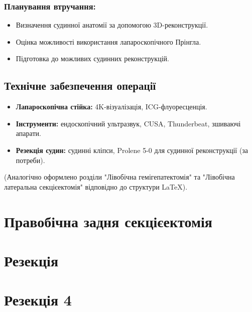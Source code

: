 \begin{refsection}
\subsubsection{Планування втручання:}
\begin{itemize}
    \item Визначення судинної анатомії за допомогою 3D-реконструкції.
    \item Оцінка можливості використання лапароскопічного Прінгла.
    \item Підготовка до можливих судинних реконструкцій.
\end{itemize}

\subsection{Технічне забезпечення операції}
\begin{itemize}
    \item \textbf{Лапароскопічна стійка:} 4K-візуалізація, ICG-флуоресценція.
    \item \textbf{Інструменти:} ендоскопічний ультразвук, CUSA, Thunderbeat, зшиваючі апарати.
    \item \textbf{Резекція судин:} судинні кліпси, Prolene 5-0 для судинної реконструкції (за потреби).
\end{itemize}

(Аналогічно оформлено розділи "Лівобічна гемігепатектомія" та "Лівобічна латеральна секцієектомія" відповідно до структури LaTeX).



\section{Правобічна задня секцієектомія}

\section{Резекція }

\section{Резекція 4 }



\printbibliography [heading=subbibliography]
\end{refsection}